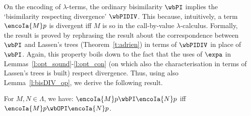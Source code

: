 



On
 the encoding of $\lambda$-terms, 
the ordinary
bisimilarity $\wbPI$ implies the `bisimilarity respecting divergence' $\wbPIDIV$. 
%
%
This
because, intuitively, a term  $\encoIa {M} p$ is divergent iff $M$ is so in the call-by-value
$\lambda$-calculus.    Formally, the result is proved by rephrasing the result about the 
correspondence between $\wbPI$ and Lassen's trees (Theorem~\ref{t:adrien}) in terms of 
$\wbPIDIV$ in place of $\wbPI$. Again, this property boils down to the fact that the uses of
$\expa$ in Lemmas~\ref{l:opt_sound}-\ref{l:opt_con} (on which also the characterisation in
terms of Lassen's trees is built) respect divergence.  
Thus, using also Lemma~\ref{l:bisDIV_op}, we derive the following result. 

\begin{theorem}
\label{t:wbPI-wbOPI}
For $M,N \in \Lambda $, we have:
$\encoIa {M} p \wbPI \encoIa {N} p$ iff 
$\encoIa {M} p \wbOPI \encoIa {N} p$. 
\end{theorem} 

